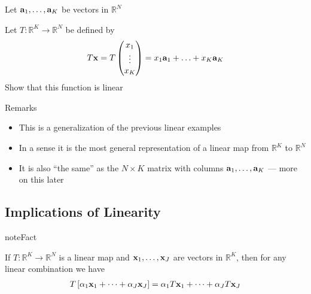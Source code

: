 \documentclass[letterpaper,10pt,english]{jupyterBook}
\begin{document}
\sphinxAtStartPar
Let \({\bf a}_1, \ldots, {\bf a}_K\) be vectors in \(\mathbb{R}^N\)

\sphinxAtStartPar
Let \(T \colon \mathbb{R}^K \to \mathbb{R}^N\) be defined by
\begin{equation*}
\begin{split}
%
T{\bf x} 
=
T
\begin{pmatrix}
x_1 \\
\vdots \\
x_K
\end{pmatrix}
=
x_1 {\bf a}_1 + \ldots + x_K {\bf a}_K
%
\end{split}
\end{equation*}
\sphinxAtStartPar
{} Show that this function is linear

\sphinxAtStartPar
Remarks
\begin{itemize}
\item {} 
\sphinxAtStartPar
This is a generalization of the previous linear examples

\item {} 
\sphinxAtStartPar
In a sense it is the most general representation of a linear map
from \(\mathbb{R}^K\) to \(\mathbb{R}^N\)

\item {} 
\sphinxAtStartPar
It is also “the same” as the \(N \times K\) matrix with
columns \({\bf a}_1, \ldots, {\bf a}_K\) — more on this later

\end{itemize}


\subsection{Implications of Linearity}
\label{\detokenize{05.linear_algebra:implications-of-linearity}}
\begin{sphinxadmonition}{note}{Fact}

\sphinxAtStartPar
If \(T \colon \mathbb{R}^K \to \mathbb{R}^N\) is a linear map and \({\bf x}_1,\ldots, {\bf x}_J\) are vectors in \(\mathbb{R}^K\), then for any linear combination we have
\begin{equation*}
\begin{split}
T
\left[ \alpha_1 {\bf x}_1 + \cdots + \alpha_J {\bf x}_J \right]
= \alpha_1 T {\bf x}_1 + \cdots + \alpha_J T {\bf x}_J
\end{split}
\end{equation*}\end{sphinxadmonition}
\end{document}
